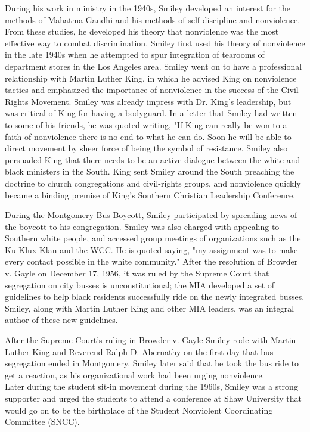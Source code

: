 During his work in ministry in the 1940s, Smiley developed an interest
for the methods of Mahatma Gandhi and his methods of self-discipline and
nonviolence. From these studies, he developed his theory that
nonviolence was the most effective way to combat discrimination. Smiley
first used his theory of nonviolence in the late 1940s when he attempted
to spur integration of tearooms of department stores in the Los Angeles
area. Smiley went on to have a professional relationship with Martin
Luther King, in which he advised King on nonviolence tactics and
emphasized the importance of nonviolence in the success of the Civil
Rights Movement. Smiley was already impress with Dr. King's leadership,
but was critical of King for having a bodyguard. In a letter that Smiley
had written to some of his friends, he was quoted writing, "If King can
really be won to a faith of nonviolence there is no end to what he can
do. Soon he will be able to direct movement by sheer force of being the
symbol of resistance. Smiley also persuaded King that there needs to be
an active dialogue between the white and black ministers in the South.
King sent Smiley around the South preaching the doctrine to church
congregations and civil-rights groups, and nonviolence quickly became a
binding premise of King's Southern Christian Leadership Conference.

During the Montgomery Bus Boycott, Smiley participated by spreading news
of the boycott to his congregation. Smiley was also charged with
appealing to Southern white people, and accessed group meetings of
organizations such as the Ku Klux Klan and the WCC. He is quoted saying,
"my assignment was to make every contact possible in the white
community." After the resolution of Browder v. Gayle on December 17,
1956, it was ruled by the Supreme Court that segregation on city busses
is unconstitutional; the MIA developed a set of guidelines to help black
residents successfully ride on the newly integrated busses. Smiley,
along with Martin Luther King and other MIA leaders, was an integral
author of these new guidelines.

After the Supreme Court's ruling in Browder v. Gayle Smiley rode with
Martin Luther King and Reverend Ralph D. Abernathy on the first day that
bus segregation ended in Montgomery. Smiley later said that he took the
bus ride to get a reaction, as his organizational work had been urging
nonviolence.\\
Later during the student sit-in movement during the 1960s, Smiley was a
strong supporter and urged the students to attend a conference at Shaw
University that would go on to be the birthplace of the Student
Nonviolent Coordinating Committee (SNCC).

